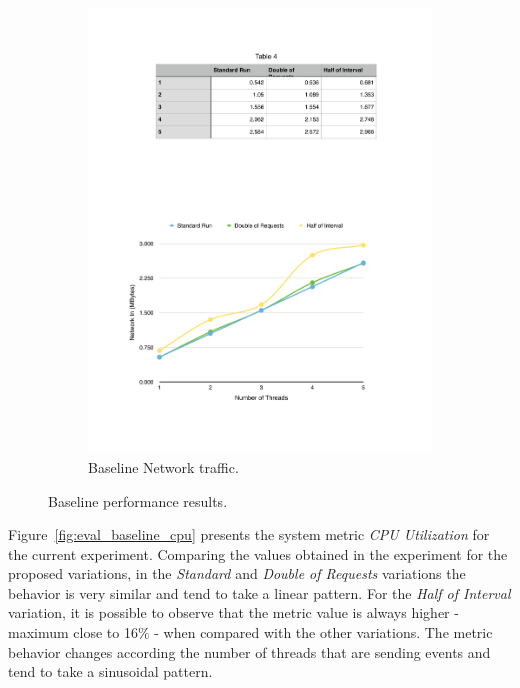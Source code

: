 \begin{figure}[ht!]
\begin{subfigure}{.5\textwidth}
  \includegraphics[width=\linewidth]{./images/network_1_lap}
  \caption{Baseline Network traffic.}
  \label{fig:eval_baseline_network}
\end{subfigure}
\caption{Baseline performance results.}
\label{fig:eval_baseline_results}
\end{figure}

Figure~\ref{fig:eval_baseline_cpu} presents the system metric \textit{CPU Utilization} for the current
experiment. Comparing the values obtained in the experiment for the proposed variations, in the
\textit{Standard} and \textit{Double of Requests} variations the behavior is very similar and tend
to take a linear pattern. For the \textit{Half of Interval} variation, it is possible to observe
that the metric value is always higher - maximum close to 16$\%$ - when compared with the other
variations. The metric behavior changes according the number of threads that are sending events and
tend to take a sinusoidal pattern.\\

